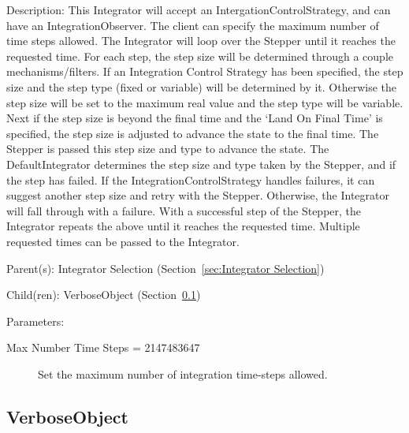 \begin{list}{}
  {\setlength{\leftmargin}{1.0in}
   \setlength{\labelwidth}{0.75in}
   \setlength{\labelsep}{0.125in}}
  \item[Description:]
    This Integrator will accept an IntergationControlStrategy, and can have an IntegrationObserver.  The client can specify the maximum number of time steps allowed.  The Integrator will loop over the Stepper until it reaches the requested time. For each step, the step size will be determined through a couple mechanisms/filters.  If an Integration Control Strategy has been specified, the step size and the step type (fixed or variable) will be determined by it.  Otherwise the step size will be set to the maximum real value and the step type will be variable.  Next if the step size is beyond the final time and the `Land On Final Time' is specified, the step size is adjusted to advance the state to the final time.  The Stepper is passed this step size and type to advance the state.  The DefaultIntegrator determines the step size and type taken by the Stepper, and if the step has failed.  If the IntegrationControlStrategy handles failures, it can suggest another step size and retry with the Stepper.  Otherwise, the Integrator will fall through with a failure.  With a successful step of the Stepper, the Integrator repeats the above until it reaches the requested time.  Multiple requested times can be passed to the Integrator.
  \item[Parent(s):]
    Integrator Selection (Section~\ref{sec:Integrator Selection})
  \item[Child(ren):]
    VerboseObject (Section~\ref{sec:VerboseObject})
  \item[Parameters:]
    \begin{description}
      \item[Max Number Time Steps = 2147483647] 
Set the maximum number of integration time-steps allowed.
\end{description}

\end{list}

\subsection{VerboseObject}
\label{sec:VerboseObject}

